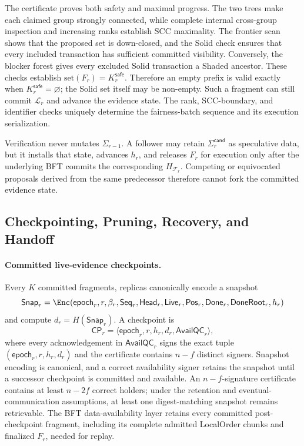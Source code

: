 The certificate proves both safety and maximal progress.  The two trees make
each claimed group strongly connected, while complete internal cross-group
inspection and increasing ranks establish SCC maximality.  The frontier scan
shows that the proposed set is down-closed, and the Solid check ensures that
every included transaction has sufficient committed visibility.  Conversely,
the blocker forest gives every excluded Solid transaction a Shaded ancestor.
These checks establish
$\mathrm{set}(F_r)=K_r^{\mathsf{safe}}$.  Therefore an empty prefix is valid
exactly when $K_r^{\mathsf{safe}}=\varnothing$; the Solid set itself may be
non-empty.  Such a fragment can still commit $\mathcal L_r$ and advance the
evidence state.  The rank, SCC-boundary, and identifier checks uniquely
determine the fairness-batch sequence and its execution serialization.

Verification never mutates $\Sigma_{r-1}$.  A follower may retain
$\Sigma_r^{\mathsf{cand}}$ as speculative data, but it installs that state,
advances $h_r$, and releases $F_r$ for execution only after the underlying BFT
commits the corresponding $H_{\mathcal F_r}$.  Competing or equivocated
proposals derived from the same predecessor therefore cannot fork the
committed evidence state.

\subsection{Checkpointing, Pruning, Recovery, and Handoff}
\label{sec:checkpoint-recovery-v4}

\paragraph{Committed live-evidence checkpoints.}
Every $K$ committed fragments, replicas canonically encode a snapshot
\[
 \mathsf{Snap}_r=\Enc(\mathsf{epoch}_r,r,\beta_r,\mathsf{Seq}_r,
 \mathsf{Head}_r,\mathsf{Live}_r,\mathsf{Pos}_r,
 \mathsf{Done}_r,\mathsf{DoneRoot}_r,h_r)
\]
and compute $d_r=H(\mathsf{Snap}_r)$.  A checkpoint is
\[
 \mathsf{CP}_r=\langle\mathsf{epoch}_r,r,h_r,d_r,
                       \mathsf{AvailQC}_r\rangle,
 \tag{14}\label{eq:checkpoint-v4}
\]
where every acknowledgement in $\mathsf{AvailQC}_r$ signs the exact tuple
$(\mathsf{epoch}_r,r,h_r,d_r)$ and the certificate contains $n-f$ distinct
signers.  Snapshot encoding is canonical, and a correct availability signer
retains the snapshot until a successor checkpoint is committed and available.
An $n-f$-signature certificate contains at least $n-2f$ correct holders;
under the retention and eventual-communication assumptions, at least one
digest-matching snapshot remains retrievable.  The BFT
data-availability layer retains every committed post-checkpoint fragment,
including its complete admitted LocalOrder chunks and finalized $F_r$, needed
for replay.

